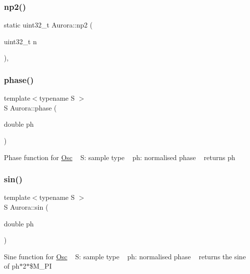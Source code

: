 \subsubsection{\texorpdfstring{np2()}{np2()}}
{\footnotesize\ttfamily static uint32\+\_\+t Aurora\+::np2 (\begin{DoxyParamCaption}\item[{uint32\+\_\+t}]{n }\end{DoxyParamCaption})\hspace{0.3cm}{\ttfamily [inline]}, {\ttfamily [static]}}

\mbox{\label{namespace_aurora_a2fab91108d29c7101741bcd2ebe1ba72}} 
\subsubsection{\texorpdfstring{phase()}{phase()}}
{\footnotesize\ttfamily template$<$typename S $>$ \\
S Aurora\+::phase (\begin{DoxyParamCaption}\item[{double}]{ph }\end{DoxyParamCaption})}

Phase function for \hyperlink{class_aurora_1_1_osc}{Osc} ~\newline
S\+: sample type ~\newline
ph\+: normalised phase ~\newline
returns ph \mbox{\label{namespace_aurora_a388ea5736944d8887f5586afd45a03b8}} 
\subsubsection{\texorpdfstring{sin()}{sin()}}
{\footnotesize\ttfamily template$<$typename S $>$ \\
S Aurora\+::sin (\begin{DoxyParamCaption}\item[{double}]{ph }\end{DoxyParamCaption})}

Sine function for \hyperlink{class_aurora_1_1_osc}{Osc} ~\newline
S\+: sample type ~\newline
ph\+: normalised phase ~\newline
returns the sine of ph$\ast$2$\ast$\$\+M\+\_\+\+PI \mbox{\label{namespace_aurora_ab93392950e0b9ae8fbbccf7cc1b55a13}} 
